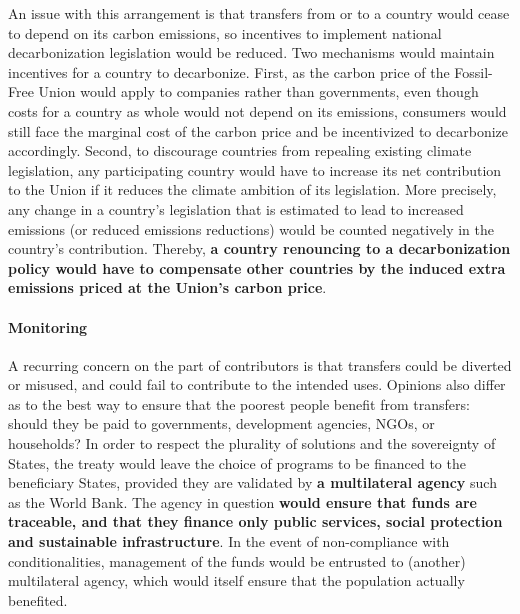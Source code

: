 \documentclass[12pt,english]{article}
\begin{document}
An issue with this arrangement is that transfers from or to a country would cease to depend on its carbon emissions, so incentives to implement national decarbonization legislation would be reduced. Two mechanisms would maintain incentives for a country to decarbonize. First, as the carbon price of the Fossil-Free Union would apply to companies rather than governments, even though costs for a country as whole would not depend on its emissions, consumers would still face the marginal cost of the carbon price and be incentivized to decarbonize accordingly. Second, to discourage countries from repealing existing climate legislation, any participating country would have to increase its net contribution to the Union if it reduces the climate ambition of its legislation. More precisely, any change in a country's legislation that is estimated to lead to increased emissions (or reduced emissions reductions) would be counted negatively in the country's contribution. Thereby, \textbf{a country renouncing to a decarbonization policy would have to compensate other countries by the induced extra emissions priced at the Union's carbon price}.

\paragraph{Monitoring}
A recurring concern on the part of contributors is that transfers could be diverted or misused, and could fail to contribute to the intended uses. Opinions also differ as to the best way to ensure that the poorest people benefit from transfers: should they be paid to governments, development agencies, NGOs, or households? 
In order to respect the plurality of solutions and the sovereignty of States, the treaty would leave the choice of programs to be financed to the beneficiary States, provided they are validated by \textbf{a multilateral agency} such as the World Bank. The agency in question \textbf{would ensure that funds are traceable, and that they finance only public services, social protection and sustainable infrastructure}. In the event of non-compliance with conditionalities, management of the funds would be entrusted to (another) multilateral agency, which would itself ensure that the population actually benefited.
\end{document}
